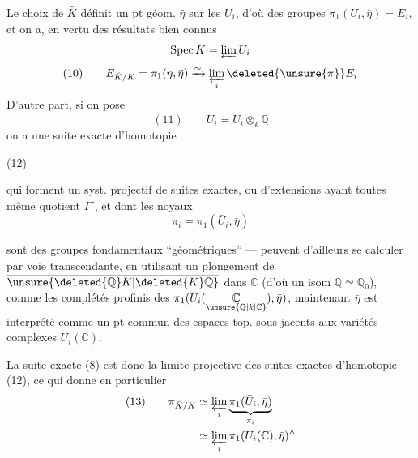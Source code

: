 Le choix de $\bar K$ définit un pt géom. $\bar\eta$ sur les $U_i$, d'où des groupes $\pi_1(U_i,\bar\eta)=E_i$, et on a, en vertu des résultats bien connus
\[
\operatorname{Spec}K=\varprojlim U_i
\]
\[
(10)\qquad E_{\bar K/K}=\pi_1(\eta,\bar\eta)\xrightarrow{\sim}\varprojlim_i\deleted{\unsure{\pi}}E_i
\]
D'autre part, si on pose
\[
(11)\qquad\bar U_i=U_i\otimes_k\overline{\mathbb Q}
\]
on a  une suite exacte d'homotopie

\noindent (12)\quad{}

qui forment un syst. projectif de suites exactes, ou d'extensions ayant toutes même quotient $\Gamma'$, et dont les noyaux
\[
\pi_i=\pi_1(\bar U_i,\bar\eta)
\]

sont des groupes fondamentaux ``géométriques'' ---  peuvent d'ailleurs se calculer par voie transcendante, en utilisant un plongement de $\overline{\unsure{\deleted{\mathbb Q}K|\deleted{K}\mathbb Q}}$ dans $\mathbb C$ (d'où un isom $\overline{\mathbb Q}\simeq\overline{\mathbb Q}_0$), comme les complétés profinis des $\pi_1(U_i(\underset{\unsure{\mathbb Q|k|\mathbb C}}{\mathbb C}),\bar\eta)$,  maintenant $\bar\eta$ est interprété comme un pt  commun des espaces top. sous-jacents aux variétés complexes $U_i(\mathbb C)$.

La suite exacte (8) est donc la limite projective des suites exactes d'homotopie (12), ce qui donne en particulier
\[
\begin{aligned}
(13)\qquad \pi_{\bar K/K}&\simeq\varprojlim_i\underbrace{\pi_1(\bar U_i,\bar\eta)}_{\pi_i}\\
&\simeq\varprojlim_i\pi_1(U_i(\mathbb C),\bar\eta)^{\wedge}
\end{aligned}
\]


